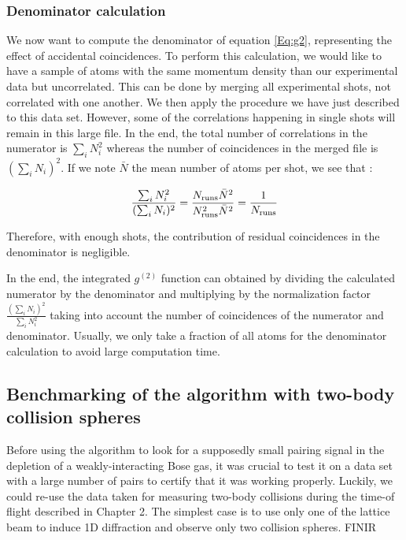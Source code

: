 \subsubsection{Denominator calculation}

We now want to compute the denominator of equation \ref{Eq:g2}, representing the effect of accidental coincidences. To perform this calculation, we would like to have a sample of atoms with the same momentum density than our experimental data but uncorrelated. This can be done by merging all experimental shots, not correlated with one another. We then apply the procedure we have just described to this data set. However, some of the correlations happening in single shots will remain in this large file. In the end, the total number of correlations in the numerator is $\sum_i N_i^2$ whereas the number of coincidences in the merged file is $(\sum_i N_i)^2$. If we note $\bar{N}$ the mean number of atoms per shot, we see that :

\begin{equation}
      \frac{\sum_i N_i^2}{(\sum_i N_i)^2}=\frac{N_{\rm{runs}} \bar{N}^2}{N_{\rm{runs}}^2 \bar{N}^2}=\frac{1}{N_{\rm{runs}}}
\end{equation}{}

Therefore, with enough shots, the contribution of residual coincidences in the denominator is negligible. 

In the end, the integrated $g^{(2)}$ function can obtained by dividing the calculated numerator by the denominator and multiplying by the normalization factor $\frac{(\sum_i N_i)^2}{\sum_i N_i^2}$ taking into account the number of coincidences of the numerator and denominator. Usually, we only take a fraction of all atoms for the denominator calculation to avoid large computation time. 

\subsection{Benchmarking of the algorithm with two-body collision spheres}

Before using the algorithm to look for a supposedly small \kmk pairing signal in the depletion of a weakly-interacting Bose gas, it was crucial to test it on a data set with a large number of \kmk pairs to certify that it was working properly. Luckily, we could re-use the data taken for measuring two-body collisions during the time-of flight described in Chapter 2. The simplest case is to use only one of the lattice beam to induce 1D diffraction and observe only two collision spheres. FINIR


